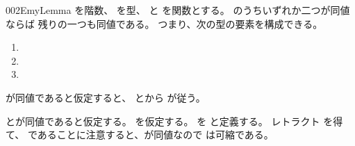 \documentclass[index]{subfiles}
\begin{document}
\begin{myBlock}{002E}{myLemma}
  を階数、
  を型、
  と
  を関数とする。
  のうちいずれか二つが同値ならば
  残りの一つも同値である。
  つまり、次の型の要素を構成できる。
  \begin{enumerate}
  \item {}
  \item {}
  \item {}
  \end{enumerate}
\end{myBlock}
\StartDefiningTabulars
\begin{myProof}
  が同値であると仮定すると、
  とから
  が従う。

  とが同値であると仮定する。
  を仮定する。
  を
  と定義する。
  レトラクト
  を得て、
  であることに注意すると、が同値なので
  は可縮である。
\end{myProof}
\StopDefiningTabulars
\end{document}
